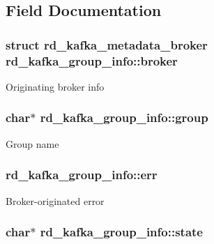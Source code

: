 \subsection{Field Documentation}
\hypertarget{structrd__kafka__group__info_a379c4e9a10ec2ae18dd7dabe660b29b0}{
\subsubsection[{broker}]{\setlength{\rightskip}{0pt plus 5cm}struct rd\_\-kafka\_\-metadata\_\-broker {\bf rd\_\-kafka\_\-group\_\-info::broker}}}
\label{structrd__kafka__group__info_a379c4e9a10ec2ae18dd7dabe660b29b0}
Originating broker info \hypertarget{structrd__kafka__group__info_a7f8c8687af579ca25e1fb088b3eae4a3}{
\subsubsection[{group}]{\setlength{\rightskip}{0pt plus 5cm}char$\ast$ {\bf rd\_\-kafka\_\-group\_\-info::group}}}
\label{structrd__kafka__group__info_a7f8c8687af579ca25e1fb088b3eae4a3}
Group name \hypertarget{structrd__kafka__group__info_ad8ad977cc6c3d8bd053afdc88876fd31}{
\subsubsection[{err}]{ {\bf rd\_\-kafka\_\-group\_\-info::err}}}
\label{structrd__kafka__group__info_ad8ad977cc6c3d8bd053afdc88876fd31}
Broker-\/originated error \hypertarget{structrd__kafka__group__info_a5160a6f8963024c42164aa828eead885}{
\subsubsection[{state}]{\setlength{\rightskip}{0pt plus 5cm}char$\ast$ {\bf rd\_\-kafka\_\-group\_\-info::state}}}
